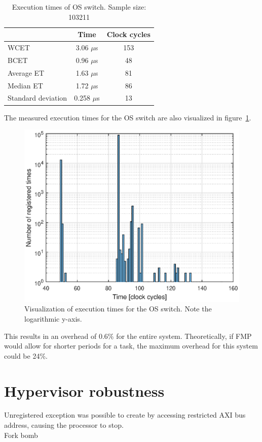 \begin{table}[H]
\centering
\begin{tabular}{|l|c|c|}
\hline
 & Time & Clock cycles \\ \hline
WCET & 3.06 $\mu$s & 153 \\ \hline
BCET & 0.96 $\mu$s & 48 \\ \hline
Average ET & 1.63 $\mu$s & 81 \\ \hline
Median ET & 1.72 $\mu$s & 86 \\ \hline
Standard deviation & 0.258 $\mu$s & 13 \\ \hline
\end{tabular}
\caption{Execution times of OS switch. Sample size: 103211}
\label{table:switch_et}
\end{table}

The measured execution times for the OS switch are also visualized in figure~\ref{fig:switch_et}.

\begin{figure}[H]
\centering
\includegraphics[width=\textwidth]{./img/results_switch_et.eps}
\caption{Visualization of execution times for the OS switch. Note the logarithmic y-axis.}\label{fig:switch_et}
\end{figure}

This results in an overhead of 0.6\% for the entire system. Theoretically, if FMP would allow for shorter periods for a task, the maximum overhead for this system could be 24\%.


\section{Hypervisor robustness}
Unregistered exception was possible to create by accessing restricted AXI bus address, causing the processor to stop.\\

Fork bomb


